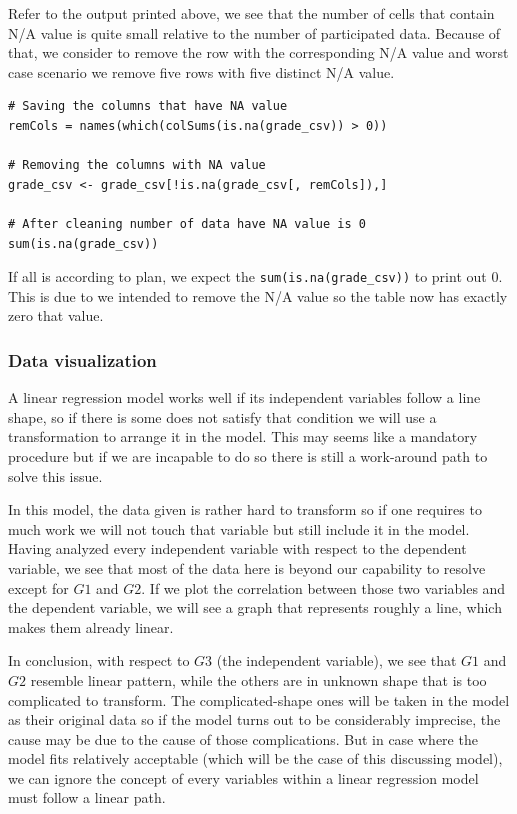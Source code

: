 \documentclass[a4paper]{article}
\newcounter{subsubsubsection}[subsubsection]
\numberwithin{equation}{section}
\begin{document}
Refer to the output printed above, we see that the number of cells that contain N/A value is quite small relative to the number of participated data. Because of that, we consider to remove the row with the corresponding N/A value and worst case scenario we remove five rows with five distinct N/A value.

\begin{mdframed}[leftline=false,rightline=false,backgroundcolor=magenta!10,nobreak=true]
  \begin{verbatim}
# Saving the columns that have NA value
remCols = names(which(colSums(is.na(grade_csv)) > 0))

# Removing the columns with NA value
grade_csv <- grade_csv[!is.na(grade_csv[, remCols]),]

# After cleaning number of data have NA value is 0
sum(is.na(grade_csv))
  \end{verbatim}
\end{mdframed}

If all is according to plan, we expect the \texttt{sum(is.na(grade_csv))} to print out 0. This is due to we intended to remove the N/A value so the table now has exactly zero that value.

\newpage

\subsubsection{Data visualization}
A linear regression model works well if its independent variables follow a line shape, so if there is some does not satisfy that condition we will use a transformation to arrange it in the model. This may seems like a mandatory procedure but if we are incapable to do so there is still a work-around path to solve this issue.

In this model, the data given is rather hard to transform so if one requires to much work we will not touch that variable but still include it in the model. Having analyzed every independent variable with respect to the dependent variable, we see that most of the data here is beyond our capability to resolve except for \(G1\) and \(G2\). If we plot the correlation between those two variables and the dependent variable, we will see a graph that represents roughly a line, which makes them already linear.

In conclusion, with respect to \(G3\) (the independent variable), we see that \(G1\) and \(G2\) resemble linear pattern, while the others are in unknown shape that is too complicated to transform. The complicated-shape ones will be taken in the model as their original data so if the model turns out to be considerably imprecise, the cause may be due to the cause of those complications. But in case where the model fits relatively acceptable (which will be the case of this discussing model), we can ignore the concept of every variables within a linear regression model must follow a linear path.
\end{document}
